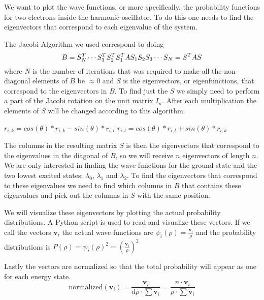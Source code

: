 

We want to plot the wave functions, or more specifically, the probability functions for two electrons inside the harmonic oscillator. To do this one needs to find the eigenvectors that correspond to each eigenvalue of the system.

The Jacobi Algorithm we used correspond to doing
$$
B = S^T_N \cdots S^T_3 \\ S^T_2 \\ S^T_1 \\ A \\ S_1 \\ S_2 \\ S_3 \cdots S_N
  = S^T A S
$$
where $N$ is the number of iterations that was required to make all the non-diagonal elements of $B$ be $\approx 0$ and $S$ is the eigenvectors, or eigenfunctions, that correspond to the eigenvectors in $B$. To find just the $S$ we simply need to perform a part of the Jacobi rotation on the unit matrix $I_n$. After each multiplication the elements of $S$ will be changed according to this algorithm:
\begin{algorithmic}
        \State$r_{i,k} = cos(\theta) * r_{i,k} - sin(\theta) * r_{i,l}$
		\State$r_{i,l} = cos(\theta) * r_{i,l} + sin(\theta) * r_{i,k}$
    \EndFor
\end{algorithmic}
The columns in the resulting matrix $S$ is then the eigenvectors that correspond to the eigenvalues in the diagonal of $B$, so we will receive $n$ eigenvectors of length $n$. We are only interested in finding the wave functions for the ground state and the two lowest excited states: $\lambda_0$, $\lambda_1$ and $\lambda_2$. To find the eigenvectors that correspond to these eigenvalues we need to find which columns in $B$ that contains these eigenvalues and pick out the columns in $S$ with the same position.

We will visualize these eigenvectors by plotting the actual probability distributions. A Python script is used to read and visualize these vectors. If we call the vectors $\mathbf{v}_i$ the actual wave functions are $\psi_i(\rho) = \frac{\mathbf{v}_i}{\rho}$ and the probability distributions is $P(\rho) = \psi_i(\rho)^2 = ( \frac{\mathbf{v}_i}{\rho} )^2$

Lastly the vectors are normalized so that the total probability will appear as one for each energy state.
$$
\mathrm{normalized}(\mathbf{v}_i)
= \frac{\mathbf{v}_i}{\mathrm{d}\rho \cdot \sum \mathbf{v}_i }
= \frac{n \cdot \mathbf{v}_i}{\rho \cdot \sum \mathbf{v}_i }
$$
